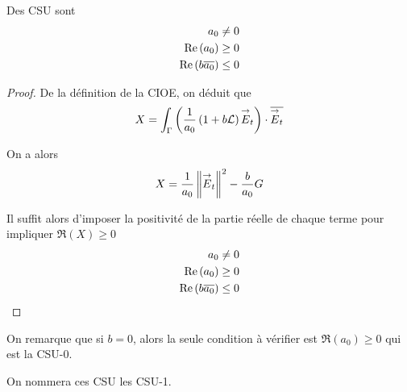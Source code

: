           \begin{prop}
            Des CSU sont
            \begin{align}
              a_0 \not= 0\\
              \operatorname{Re}\left(a_0\right) \ge 0\\
              \operatorname{Re}\left(b{\overline{a_0}}\right) \le 0
            \end{align}
          \end{prop}
          \begin{proof}
            De la définition de la CIOE, on déduit que
            \[
              X = \int_\Gamma \left( \dfrac{1}{a_0}\left(1+b\mathcal{L}\right){\overset{\rightarrow}{E}}_t\right) \cdot {\overline{{\overset{\rightarrow}{E}}_t}} 
            \]

            On a alors
            \begin{equation}
              \label{eq:unicite:form_var:decomp_cgu_ci1_a1_nul}
              X = \dfrac{1}{a_0}\left\lVert{\overset{\rightarrow}{E}}_t\right\rVert^2  - \dfrac{b}{a_0}G
            \end{equation}

            Il suffit alors d'imposer la positivité de la partie réelle de chaque terme pour impliquer \(\Re(X)\ge0\)
            \begin{align}
              a_0 \not= 0
              \\
              \operatorname{Re}\left(a_0\right) \ge 0
              \\
              \operatorname{Re}\left(b{\overline{a_0}}\right) \le 0
            \end{align}
          \end{proof}

          On remarque que si \(b=0\), alors la seule condition à vérifier est \(\Re(a_0) \ge 0\) qui est la CSU-0.

          On nommera ces CSU les CSU-1.

